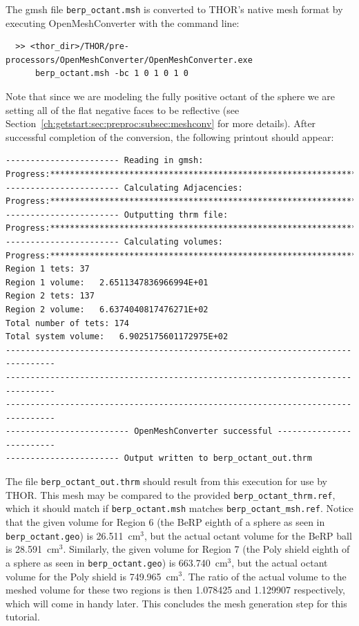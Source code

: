 The gmsh file \verb"berp_octant.msh" is converted to \ac{THOR}'s native mesh format by executing OpenMeshConverter with the command line:
\begin{verbatim}
  >> <thor_dir>/THOR/pre-processors/OpenMeshConverter/OpenMeshConverter.exe
      berp_octant.msh -bc 1 0 1 0 1 0
\end{verbatim}
Note that since we are modeling the fully positive octant of the sphere we are setting all of the flat negative faces to be reflective (see Section~\ref{ch:getstart:sec:preproc:subsec:meshconv} for more details).
After successful completion of the conversion, the following printout should appear:
\begin{verbatim}
----------------------- Reading in gmsh:
Progress:***********************************************************************
----------------------- Calculating Adjacencies:
Progress:***********************************************************************
----------------------- Outputting thrm file:
Progress:***********************************************************************
----------------------- Calculating volumes:
Progress:***********************************************************************
Region 1 tets: 37
Region 1 volume:   2.6511347836966994E+01
Region 2 tets: 137
Region 2 volume:   6.6374040817476271E+02
Total number of tets: 174
Total system volume:   6.9025175601172975E+02
--------------------------------------------------------------------------------
--------------------------------------------------------------------------------
--------------------------------------------------------------------------------
------------------------- OpenMeshConverter successful -------------------------
----------------------- Output written to berp_octant_out.thrm
\end{verbatim}

The file \verb"berp_octant_out.thrm" should result from this execution for use by \ac{THOR}.
This mesh may be compared to the provided \verb"berp_octant_thrm.ref", which it should match if \verb"berp_octant.msh" matches \verb"berp_octant_msh.ref".
Notice that the given volume for Region 6 (the BeRP eighth of a sphere as seen in \verb"berp_octant.geo") is 26.511~cm$^3$, but the actual octant volume for the BeRP ball is 28.591~cm$^3$.
Similarly, the given volume for Region 7 (the Poly shield eighth of a sphere as seen in \verb"berp_octant.geo") is 663.740~cm$^3$, but the actual octant volume for the Poly shield is 749.965~cm$^3$.
The ratio of the actual volume to the meshed volume for these two regions is then 1.078425 and 1.129907 respectively, which will come in handy later.
This concludes the mesh generation step for this tutorial.

